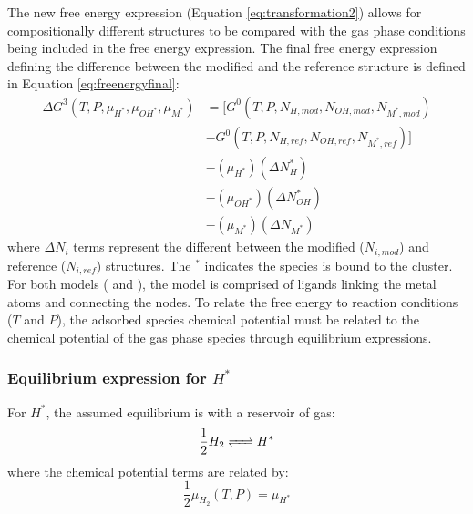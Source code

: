 \documentclass[12pt]{article}
\begin{document}
The new free energy expression (Equation \ref{eq:transformation2}) allows for compositionally different structures to be compared with the gas phase conditions being included in the free energy expression. The final free energy expression defining the difference between the modified and the reference structure is defined in Equation \ref{eq:freenergyfinal}:
\begin{equation}
    \begin{split}
        \Delta G^{3}(T,P,\mu_{H^{*}},\mu_{OH^{*}},\mu_{M^{*}}) &= \Big[G^{0}(T,P,N_{H,mod},N_{OH,mod},N_{M^{*},mod}) \\ &- G^{0}(T,P,N_{H,ref},N_{OH,ref},N_{M^{*},ref}) \Big] \\ &- (\mu_{H^{*}})(\Delta N_{H}^{*}) \\ &- (\mu_{OH^{*}})(\Delta N_{OH}^{*}) \\ &- (\mu_{M^{*}})(\Delta N_{M^{*}}) 
    \end{split}
    \label{eq:freenergyfinal}
\end{equation}
where $\Delta N_{i}$ terms represent the different between the modified ($N_{i,mod}$) and reference ($N_{i,ref}$) structures. The $^{*}$ indicates the species is bound to the cluster. For both models ( and ), the model is comprised of  ligands linking the metal atoms and connecting the  nodes. To relate the free energy to reaction conditions ($T$ and $P$), the adsorbed species chemical potential must be related to the chemical potential of the gas phase species through equilibrium expressions. \\ 

\subsubsection{Equilibrium expression for $H^{*}$}
For $H^{*}$, the assumed equilibrium is with a reservoir of  gas:
\begin{equation}
    \frac{1}{2} H_{2} \ce{<=>} H^{*}
\end{equation}
where the chemical potential terms are related by: 
\begin{equation}
    \frac{1}{2} \mu_{H_{2}}(T,P) = \mu_{H^{*}}
\end{equation}
\end{document}
